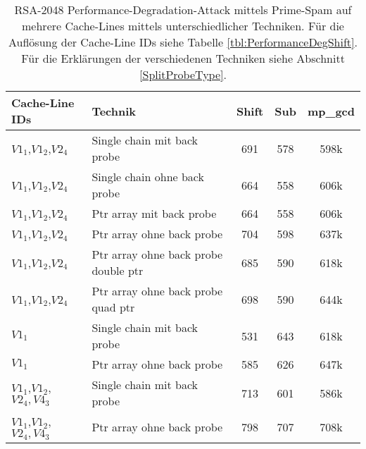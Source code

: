 


\begin{table}[h]
\caption{RSA-2048 Performance-Degradation-Attack mittels Prime-Spam auf mehrere Cache-Lines mittels unterschiedlicher Techniken. Für die Auflösung der Cache-Line IDs siehe Tabelle \ref{tbl:PerformanceDegShift}. Für die Erklärungen der verschiedenen Techniken siehe Abschnitt \ref{SplitProbeType}.}
\label{tbl:PerformanceDegDifferentVariants}
\begin{tabular}{llccc}
\toprule
 Cache-Line IDs & Technik    & Shift & Sub & mp\_gcd \\
\midrule
$V1_1$,$V1_2$,$V2_4$ & Single chain mit back probe & 691   & 578  & 598k    \\
$V1_1$,$V1_2$,$V2_4$ & Single chain ohne back probe & 664   & 558 & 606k    \\
$V1_1$,$V1_2$,$V2_4$ & Ptr array mit back probe & 664   & 558 & 606k    \\
$V1_1$,$V1_2$,$V2_4$ & Ptr array ohne back probe & 704   & 598 & 637k    \\
$V1_1$,$V1_2$,$V2_4$ & Ptr array ohne back probe double ptr & 685 & 590 & 618k    \\
$V1_1$,$V1_2$,$V2_4$ & Ptr array ohne back probe quad ptr & 698 & 590 & 644k    \\
\midrule
$V1_1$ & Single chain mit back probe & 531 & 643 & 618k    \\
$V1_1$ & Ptr array ohne back probe & 585 & 626 & 647k    \\
\midrule
$V1_1$,$V1_2$,$V2_4,V4_3$ & Single chain mit back probe & 713 & 601 & 586k    \\
$V1_1$,$V1_2$,$V2_4,V4_3$ & Ptr array ohne back probe & 798 & 707 & 708k    \\
\bottomrule
\end{tabular}
\end{table}






